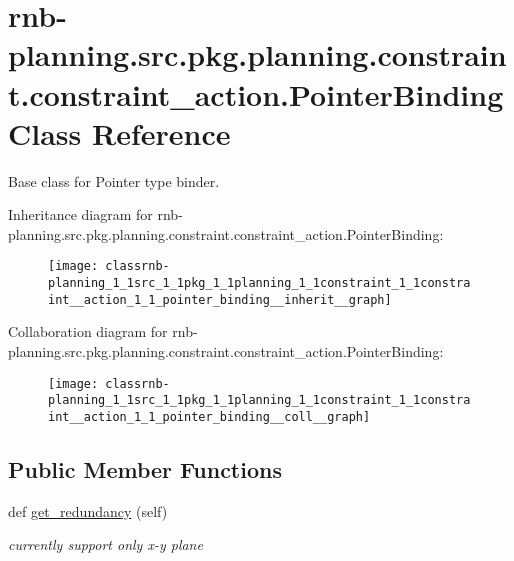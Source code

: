 \hypertarget{classrnb-planning_1_1src_1_1pkg_1_1planning_1_1constraint_1_1constraint__action_1_1_pointer_binding}{}\section{rnb-\/planning.src.\+pkg.\+planning.\+constraint.\+constraint\+\_\+action.\+Pointer\+Binding Class Reference}
\label{classrnb-planning_1_1src_1_1pkg_1_1planning_1_1constraint_1_1constraint__action_1_1_pointer_binding}


Base class for Pointer type binder.  




Inheritance diagram for rnb-\/planning.src.\+pkg.\+planning.\+constraint.\+constraint\+\_\+action.\+Pointer\+Binding\+:
\nopagebreak
\begin{figure}[H]
\begin{center}
\leavevmode
\texttt{[image: classrnb-planning\_1\_1src\_1\_1pkg\_1\_1planning\_1\_1constraint\_1\_1constraint\_\_action\_1\_1\_pointer\_binding\_\_inherit\_\_graph]}
\end{center}
\end{figure}


Collaboration diagram for rnb-\/planning.src.\+pkg.\+planning.\+constraint.\+constraint\+\_\+action.\+Pointer\+Binding\+:
\nopagebreak
\begin{figure}[H]
\begin{center}
\leavevmode
\texttt{[image: classrnb-planning\_1\_1src\_1\_1pkg\_1\_1planning\_1\_1constraint\_1\_1constraint\_\_action\_1\_1\_pointer\_binding\_\_coll\_\_graph]}
\end{center}
\end{figure}
\subsection*{Public Member Functions}
\begin{DoxyCompactItemize}
\item 
\mbox{\label{classrnb-planning_1_1src_1_1pkg_1_1planning_1_1constraint_1_1constraint__action_1_1_pointer_binding_a3a6f884eb8b39403fd31ad720e2ad757}} 
def \hyperlink{classrnb-planning_1_1src_1_1pkg_1_1planning_1_1constraint_1_1constraint__action_1_1_pointer_binding_a3a6f884eb8b39403fd31ad720e2ad757}{get\+\_\+redundancy} (self)
\begin{DoxyCompactList}\small\item\em currently support only x-\/y plane \end{DoxyCompactList}\end{DoxyCompactItemize}
